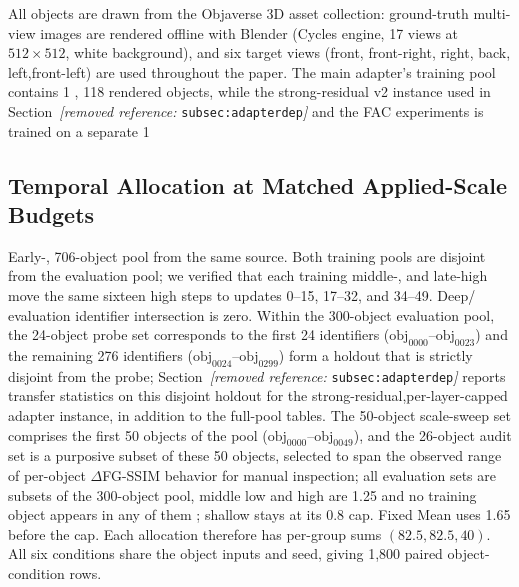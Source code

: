 \documentclass[times,twocolumn,final]{elsarticle}
\providecommand{\DIFadd}[1]{{\protect\color{blue} \sf #1}} %
\providecommand{\DIFdel}[1]{{\protect\color{red} \scriptsize #1}} %
\providecommand{\DIFaddbegin}{} %
\providecommand{\DIFaddend}{} %
\providecommand{\DIFdelbegin}{} %
\providecommand{\DIFdelend}{} %
\begin{document}
\DIFdel{All objects are drawn from the Objaverse 3D asset collection: ground-truth multi-view images are rendered offline with Blender (Cycles engine, 17 views at $512\times512$, white background), and six target views (front, front-right, right, back, left,front-left) are used throughout the paper.
The main adapter's training pool contains 1}%
\DIFdel{,}%
\DIFdel{118 rendered objects, while the strong-residual v2 instance used in Section~\textit{[removed reference: }\texttt{subsec:adapterdep}\textit{]} and the FAC experiments is trained on a separate 1}%
\DIFdelend \DIFaddbegin \subsection{Temporal Allocation at Matched Applied-Scale Budgets}
\label{subsec:matched-budget300}
\DIFadd{Early-}\DIFaddend , \DIFdelbegin %
\DIFdel{706-object pool from the same source. Both training pools are disjoint from the evaluation pool; we verified that each training}\DIFdelend \DIFaddbegin \DIFadd{middle-, and late-high move the same sixteen high steps to updates 0--15, 17--32, and 34--49. Deep}\DIFaddend /\DIFdelbegin \DIFdel{evaluation identifier intersection is zero. Within the 300-object evaluation pool, the 24-object probe set corresponds to the first 24 identifiers ($\mathrm{obj}_{0000}$--$\mathrm{obj}_{0023}$) and the remaining 276 identifiers ($\mathrm{obj}_{0024}$--$\mathrm{obj}_{0299}$) form a holdout that is strictly disjoint from the probe; Section~\textit{[removed reference: }\texttt{subsec:adapterdep}\textit{]} reports transfer statistics on this disjoint holdout for the strong-residual,per-layer-capped adapter instance, in addition to the full-pool tables. The 50-object scale-sweep set comprises the first 50 objects of the pool ($\mathrm{obj}_{0000}$--$\mathrm{obj}_{0049}$), and the 26-object audit set is a purposive subset of these 50 objects, selected to span the observed range of per-object $\Delta$FG-SSIM behavior for manual inspection; all evaluation sets are subsets of the 300-object pool, }\DIFdelend \DIFaddbegin \DIFadd{middle low and high are 1.25 }\DIFaddend and \DIFdelbegin \DIFdel{no training object appears in any of them}\DIFdelend \DIFaddbegin \DIFadd{2.50; shallow stays at its 0.8 cap. Fixed Mean uses 1.65 before the cap. Each allocation therefore has per-group sums $(82.5,82.5,40)$. All six conditions share the object inputs and seed, giving 1,800 paired object-condition rows.
}
\end{document}
